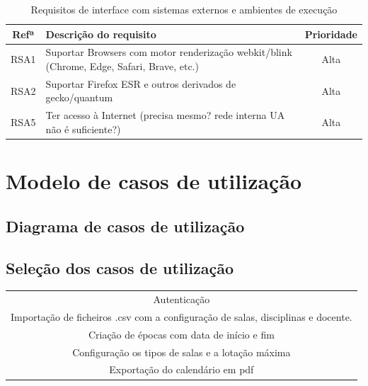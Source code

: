 \documentclass[11pt, twoside]{report}
\begin{document}
	
	
	
	\begin{table}[H]
		\caption{Requisitos de interface com sistemas externos e ambientes de execução}
		\begin{center}
			\begin{tabularx}{\textwidth}{|c|X|c|}
				\hline
				\textbf{Refª }	& \textbf{Descrição do requisito} & \textbf{Prioridade}\\
				\hline
				RSA1 & Suportar Browsers com motor renderização webkit/blink (Chrome, Edge, Safari, Brave, etc.)  & Alta \\
				\hline
				RSA2 & Suportar Firefox ESR e outros derivados de gecko/quantum & Alta \\
				\hline
				RSA5 & Ter acesso à Internet (precisa mesmo? rede interna UA não é suficiente?) & Alta\\
				\hline
			\end{tabularx}
			\label{requisitosdesistemas}
		\end{center}
	\end{table}
		
	
	\chapter{Modelo de casos de utilização}
	\section{Diagrama de casos de utilização}
	\section{Seleção dos casos de utilização}
	
	\begin{table}[H]
		\begin{center}
			\begin{tabularx}{\textwidth}{|c|}
		
		Autenticação\\
		Importação de ficheiros .csv com a configuração de salas, disciplinas e docente. \\
	 	Criação de épocas com data de início e fim \\
	 	Configuração os tipos de salas e a lotação máxima\\
	 	Exportação do calendário em pdf\\
	 	\end{tabularx}
	 	\end{center}
		
	\end{table}
	
\end{document}
